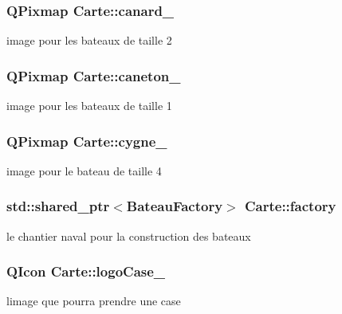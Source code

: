 \subsubsection[{\texorpdfstring{canard\+\_\+}{canard_}}]{\setlength{\rightskip}{0pt plus 5cm}Q\+Pixmap Carte\+::canard\+\_\+\hspace{0.3cm}{\ttfamily [protected]}}\hypertarget{class_carte_aaa54051f62acfe29059fb0973d977828}{}\label{class_carte_aaa54051f62acfe29059fb0973d977828}
image pour les bateaux de taille 2 
\subsubsection[{\texorpdfstring{caneton\+\_\+}{caneton_}}]{\setlength{\rightskip}{0pt plus 5cm}Q\+Pixmap Carte\+::caneton\+\_\+\hspace{0.3cm}{\ttfamily [protected]}}\hypertarget{class_carte_a824ab30e6ce53cc9c65c8af8146867f0}{}\label{class_carte_a824ab30e6ce53cc9c65c8af8146867f0}
image pour les bateaux de taille 1 
\subsubsection[{\texorpdfstring{cygne\+\_\+}{cygne_}}]{\setlength{\rightskip}{0pt plus 5cm}Q\+Pixmap Carte\+::cygne\+\_\+\hspace{0.3cm}{\ttfamily [protected]}}\hypertarget{class_carte_a9077e065a5b672393b68afcbde4951f3}{}\label{class_carte_a9077e065a5b672393b68afcbde4951f3}
image pour le bateau de taille 4 
\subsubsection[{\texorpdfstring{factory}{factory}}]{\setlength{\rightskip}{0pt plus 5cm}std\+::shared\+\_\+ptr$<${\bf Bateau\+Factory}$>$ Carte\+::factory\hspace{0.3cm}{\ttfamily [protected]}}\hypertarget{class_carte_afbc674d4d0a924d3a73c6f3f966a723a}{}\label{class_carte_afbc674d4d0a924d3a73c6f3f966a723a}
le chantier naval pour la construction des bateaux 
\subsubsection[{\texorpdfstring{logo\+Case\+\_\+}{logoCase_}}]{\setlength{\rightskip}{0pt plus 5cm}Q\+Icon Carte\+::logo\+Case\+\_\+\hspace{0.3cm}{\ttfamily [protected]}}\hypertarget{class_carte_a8f5f0d81b5134126a52d338ea5d28dc6}{}\label{class_carte_a8f5f0d81b5134126a52d338ea5d28dc6}
l\textquotesingle{}image que pourra prendre une case 
